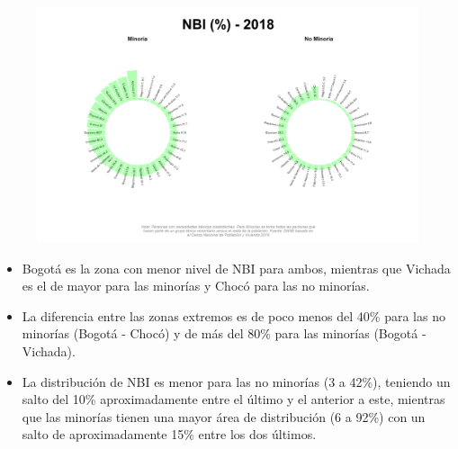     \begin{figure}[H]
        \caption[Necesidades Básicas Insatisfechas para minorías y no minorías en el 2018 ]{\label{nbi_minorias} }
        \begin{center}
        \includegraphics[width=\textwidth,keepaspectratio]{img/var_272_static.png}
        \end{center}
    \end{figure}
            \begin{itemize}
                    \item Bogotá es la zona con menor nivel de NBI para ambos, mientras que Vichada es el de mayor para las minorías y Chocó para las no minorías.
                    \item La diferencia entre las zonas extremos es de poco menos del 40\% para las no minorías (Bogotá - Chocó) y de más del 80\% para las minorías (Bogotá - Vichada).
                    \item La distribución de NBI es menor para las no minorías (3 a 42\%), teniendo un salto del 10\% aproximadamente entre el último y el anterior a este, mientras que las minorías tienen una mayor área de distribución (6 a 92\%) con un salto de aproximadamente 15\% entre los dos últimos.
                    \end{itemize}

